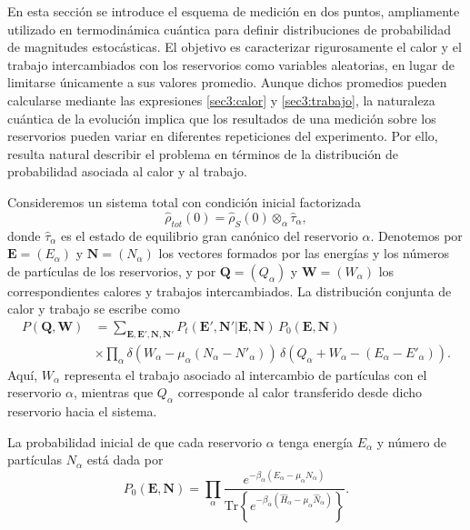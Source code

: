 En esta sección se introduce el esquema de medición en dos puntos, ampliamente utilizado en termodinámica cuántica para definir distribuciones de probabilidad de magnitudes estocásticas\cite{esposito2009nonequilibrium}. El objetivo es caracterizar rigurosamente el calor y el trabajo intercambiados con los reservorios como variables aleatorias, en lugar de limitarse únicamente a sus valores promedio. Aunque dichos promedios pueden calcularse mediante las expresiones \eqref{sec3:calor} y \eqref{sec3:trabajo}, la naturaleza cuántica de la evolución implica que los resultados de una medición sobre los reservorios pueden variar en diferentes repeticiones del experimento. Por ello, resulta natural describir el problema en términos de la distribución de probabilidad asociada al calor y al trabajo.

Consideremos un sistema total con condición inicial factorizada
\[
\hat{\rho}_{tot}(0) = \hat{\rho}_{S}(0)\otimes_{\alpha}\hat{\tau}_{\alpha},
\]
donde $\hat{\tau}_{\alpha}$ es el estado de equilibrio gran canónico del reservorio $\alpha$. Denotemos por $\mathbf{E}=(E_{\alpha})$ y $\mathbf{N}=(N_{\alpha})$ los vectores formados por las energías y los números de partículas de los reservorios, y por $\mathbf{Q}=(Q_{\alpha})$ y $\mathbf{W}=(W_{\alpha})$ los correspondientes calores y trabajos intercambiados. La distribución conjunta de calor y trabajo se escribe como
\begin{align*}
    P(\mathbf{Q},\mathbf{W}) & = \sum_{\mathbf{E},\mathbf{E}',\mathbf{N},\mathbf{N}'} 
    P_{t}(\mathbf{E}',\mathbf{N}'|\mathbf{E},\mathbf{N})\, P_{0}(\mathbf{E},\mathbf{N}) \\
    & \times \prod_{\alpha} \delta\!\left(W_{\alpha}-\mu_{\alpha}(N_{\alpha}-N'_{\alpha})\right)\,
    \delta\!\left(Q_{\alpha}+W_{\alpha}-(E_{\alpha}-E'_{\alpha})\right).
\end{align*}
Aquí, $W_\alpha$ representa el trabajo asociado al intercambio de partículas con el reservorio $\alpha$, mientras que $Q_\alpha$ corresponde al calor transferido desde dicho reservorio hacia el sistema.

La probabilidad inicial de que cada reservorio $\alpha$ tenga energía $E_{\alpha}$ y número de partículas $N_{\alpha}$ está dada por
\[
P_{0}(\mathbf{E},\mathbf{N}) = 
\prod_{\alpha}  
\frac{e^{-\beta_{\alpha}(E_{\alpha}-\mu_{\alpha}N_{\alpha})}}
{\text{Tr}\left\{e^{-\beta_{\alpha}(\hat{H}_{\alpha}-\mu_{\alpha}\hat{N}_{\alpha})}\right\}}.
\]

